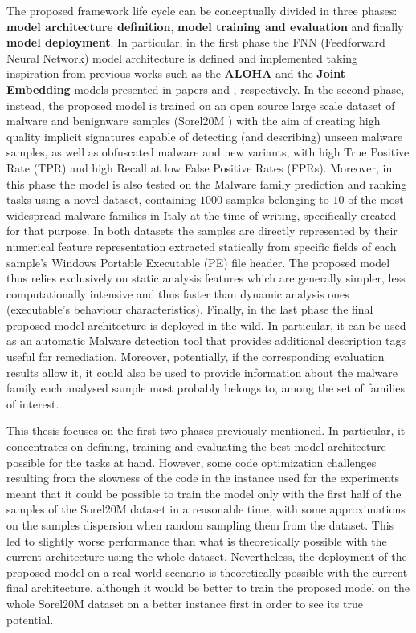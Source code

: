 \documentclass[pdfa%
,cucitura%
]{toptesi}
\begin{document}
The proposed framework life cycle can be conceptually divided in three phases: \textbf{model architecture definition}, \textbf{model training and evaluation} and finally \textbf{model deployment}. In particular, in the first phase the FNN (Feedforward Neural Network) model architecture is defined and implemented taking inspiration from previous works such as the \textbf{ALOHA} and the \textbf{Joint Embedding} models presented in papers \cite{ruddALOHA} and \cite{DucauAMDATSE}, respectively. In the second phase, instead, the proposed model is trained on an open source large scale dataset of malware and benignware samples (Sorel20M \cite{HarangSOREL20M}) with the aim of creating high quality implicit signatures capable of detecting (and describing) unseen malware samples, as well as obfuscated malware and new variants, with high True Positive Rate (TPR) and high Recall at low False Positive Rates (FPRs). Moreover, in this phase the model is also tested on the Malware family prediction and ranking tasks using a novel dataset, containing $1000$ samples belonging to $10$ of the most widespread malware families in Italy at the time of writing, specifically created for that purpose. In both datasets the samples are directly represented by their numerical feature representation extracted statically from specific fields of each sample's Windows Portable Executable (PE) file header. The proposed model thus relies exclusively on static analysis features which are generally simpler, less computationally intensive and thus faster than dynamic analysis ones (executable's behaviour characteristics). Finally, in the last phase the final proposed model architecture is deployed in the wild. In particular, it can be used as an automatic Malware detection tool that provides additional description tags useful for remediation. Moreover, potentially, if the corresponding evaluation results allow it, it could also be used to provide information about the malware family each analysed sample most probably belongs to, among the set of families of interest.

This thesis focuses on the first two phases previously mentioned. In particular, it concentrates on defining, training and evaluating the best model architecture possible for the tasks at hand. However, some code optimization challenges resulting from the slowness of the code in the instance used for the experiments meant that it could be possible to train the model only with the first half of the samples of the Sorel20M dataset in a reasonable time, with some approximations on the samples dispersion when random sampling them from the dataset. This led to slightly worse performance than what is theoretically possible with the current architecture using the whole dataset. Nevertheless, the deployment of the proposed model on a real-world scenario is theoretically possible with the current final architecture, although it would be better to train the proposed model on the whole Sorel20M dataset on a better instance first in order to see its true potential.
\end{document}
